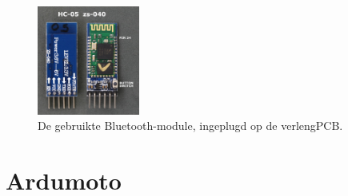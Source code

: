 \begin{figure}[h]
\centering
\includegraphics[width=0.3\textwidth]{HC05.jpg}
\caption{De gebruikte Bluetooth-module, ingeplugd op de verlengPCB.}
\label{fig:HC05}
\end{figure}
\section{Ardumoto}
